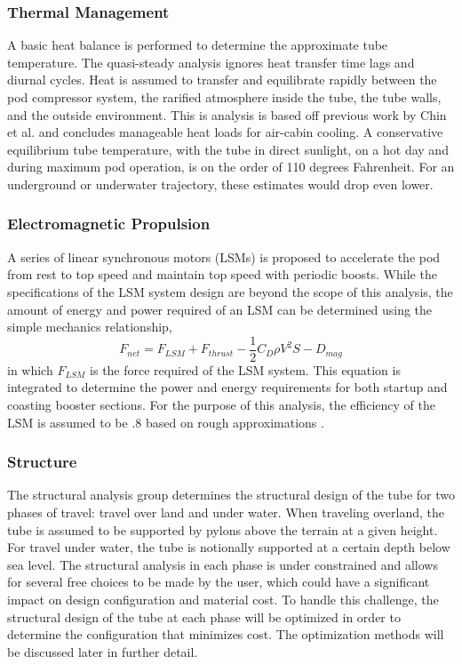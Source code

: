\subsubsection{Thermal Management}
	A basic heat balance is performed to determine the approximate tube
	temperature. The quasi-steady analysis ignores heat transfer time lags and
	diurnal cycles. Heat is assumed to transfer and equilibrate rapidly
	between the pod compressor system, the rarified atmosphere inside the
	tube, the tube walls, and the outside environment. This is analysis is
	based off previous work by Chin et al.\cite{Chin} and concludes manageable heat
	loads for air-cabin cooling. A conservative equilibrium tube temperature,
	with the tube in direct sunlight, on a hot day and during maximum pod
	operation, is on the order of 110 degrees Fahrenheit. For an underground
	or underwater trajectory, these estimates would drop even lower.
\subsubsection{Electromagnetic Propulsion}
	A series of linear synchronous motors (LSMs) is proposed to accelerate the
	pod from rest to top speed and maintain top speed with periodic boosts.
	While the specifications of the LSM system design are beyond the scope of
	this analysis, the amount of energy and power required of an LSM can be
	determined using the simple mechanics relationship,
	\begin{equation}
		\label{eq:sum_of_forces}
		F_{net} = F_{LSM} + F_{thrust} - \frac{1}{2}C_{D}\rho V^{2}S - D_{mag}
	\end{equation}
	in which $F_{LSM}$ is the force required of the LSM system. This equation
	is integrated to determine the power and energy requirements for both
	startup and coasting booster sections. For the purpose of this analysis,
	the efficiency of the LSM is assumed to be .8 based on rough approximations \cite{LSM}.
\subsubsection{Structure}
	The structural analysis group determines the structural design of the tube
	for two phases of travel: travel over land and under water. When traveling
	overland, the tube is assumed to be supported by pylons above the terrain
	at a given height. For travel under water, the tube is notionally
	supported at a certain depth below sea level. The structural analysis in
	each phase is under constrained and allows for several free choices to be
	made by the user, which could have a significant impact on design
	configuration and material cost. To handle this challenge, the structural
	design of the tube at each phase will be optimized in order to determine
	the configuration that minimizes cost. The optimization methods will be
	discussed later in further detail.

